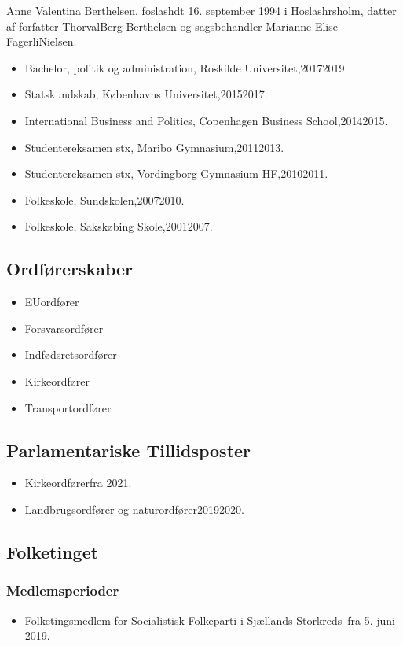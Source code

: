 \documentclass[11pt, a4paper]{awesome-cv}
\begin{document}
\makecvheader[R]
\makelettertitle
\begin{cvletter}
Anne Valentina Berthelsen, foslashdt 16. september 1994 i Hoslashrsholm, datter af forfatter ThorvalBerg Berthelsen og sagsbehandler Marianne Elise FagerliNielsen.

\begin{itemize}
\item Bachelor, politik og administration, Roskilde Universitet,20172019.
\item Statskundskab, Københavns Universitet,20152017.
\item International Business and Politics, Copenhagen Business School,20142015.
\item Studentereksamen stx, Maribo Gymnasium,20112013.
\item Studentereksamen stx, Vordingborg Gymnasium  HF,20102011.
\item Folkeskole, Sundskolen,20072010.
\item Folkeskole, Sakskøbing Skole,20012007.
\end{itemize}
\subsection*{Ordførerskaber}
\begin{itemize}
\item EUordfører
\item Forsvarsordfører
\item Indfødsretsordfører
\item Kirkeordfører
\item Transportordfører
\end{itemize}
\subsection*{Parlamentariske Tillidsposter}
\begin{itemize}
\item Kirkeordførerfra 2021.
\item Landbrugsordfører og naturordfører20192020.
\end{itemize}
\subsection*{Folketinget}
\subsubsection*{Medlemsperioder}
\begin{itemize}
\item Folketingsmedlem for Socialistisk Folkeparti i Sjællands Storkreds fra 5. juni 2019.
\end{itemize}

\end{cvletter}
\end{document}
